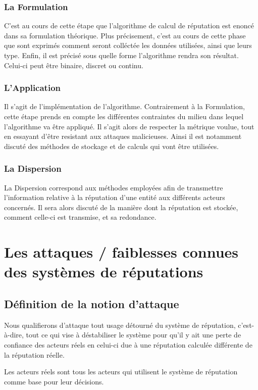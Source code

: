 \documentclass[a4paper, 11pt]{article} %
\begin{document}
\subsubsection{La Formulation}
C'est au cours de cette étape que l'algorithme de calcul de réputation est enoncé dans sa formulation théorique.
Plus précisement, c'est au cours de cette phase que sont exprimés comment seront colléctée les données utilisées, ainsi que leurs type.
Enfin, il est précisé sous quelle forme l'algorithme rendra son résultat. Celui-ci peut être binaire, discret ou continu.

\subsubsection{L'Application}
Il s'agit de l'implémentation de l'algorithme.
Contrairement à la Formulation, cette étape prends en compte les différentes contraintes du milieu dans lequel l'algorithme va être appliqué.
Il s'agit alors de respecter la métrique voulue, tout en essayant d'être resistant aux attaques malicieuses.
Ainsi il est notamment discuté des méthodes de stockage et de calculs qui vont être utilisées.

\subsubsection{La Dispersion}
La Dispersion correspond aux méthodes employées afin de transmettre l'information relative à la réputation d'une entité aux différents acteurs concernés.
Il sera alors discuté de la manière dont la réputation est stockée, comment celle-ci est transmise, et sa redondance.

\section{Les attaques / faiblesses connues des systèmes de réputations}
\subsection{Définition de la notion d'attaque}
Nous qualifierons d'attaque tout usage détourné du système de réputation,
c'est-à-dire, tout ce qui vise à déstabiliser le système pour qu'il y ait une
perte de confiance des acteurs réels en celui-ci due à une réputation calculée
différente de la réputation réelle.

Les acteurs réels sont tous les acteurs qui utilisent le système de réputation
comme base pour leur décisions.
\end{document}
